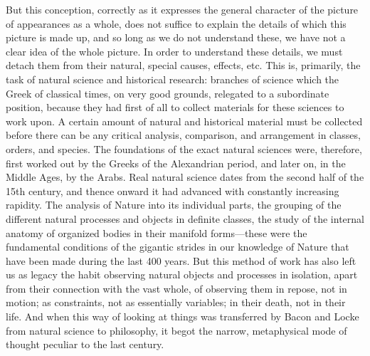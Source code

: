 But this conception, correctly as it expresses the general character of the
picture of appearances as a whole, does not suffice to explain the details of
which this picture is made up, and so long as we do not understand these, we
have not a clear idea of the whole picture. In order to understand these
details, we must detach them from their natural, special causes, effects, etc.
This is, primarily, the task of natural science and historical research:
branches of science which the Greek of classical times, on very good grounds,
relegated to a subordinate position, because they had first of all to collect
materials for these sciences to work upon. A certain amount of natural and
historical material must be collected before there can be any critical
analysis, comparison, and arrangement in classes, orders, and species. The
foundations of the exact natural sciences were, therefore, first worked out by
the Greeks of the Alexandrian period, and later on, in the Middle Ages, by the Arabs. Real natural science dates
from the second half of the 15th century, and thence onward it had advanced
with constantly increasing rapidity. The analysis of Nature into its individual
parts, the grouping of the different natural processes and objects in definite
classes, the study of the internal anatomy of organized bodies in their
manifold forms---these were the fundamental conditions of the gigantic strides
in our knowledge of Nature that have been made during the last 400 years. But
this method of work has also left us as legacy the habit observing natural
objects and processes in isolation, apart from their connection with the vast
whole, of observing them in repose, not in motion; as constraints, not as
essentially variables; in their death, not in their life. And when this way of
looking at things was transferred by Bacon and Locke from natural science to
philosophy, it begot the narrow, metaphysical mode of thought peculiar to the
last century.

\printendnotes
